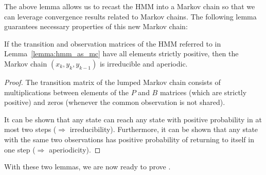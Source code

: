 \documentclass[journal]{IEEEtran}
\begin{document}
The above lemma allows us to recast the HMM into a Markov chain so that we can
leverage convergence results related to Markov chains. The following lemma
guarantees necessary properties of this new Markov chain:
\begin{lemma}
    If the transition and observation matrices of the HMM referred to in
    Lemma~\ref{lemma:hmm_as_mc} have all elements strictly positive, then the
    Markov chain $(x_k, y_k, y_{k-1})$ is irreducible and aperiodic.
    \label{lemma:ergodic_hmm_as_mc}
\end{lemma}
\begin{proof}
    The transition matrix of the lumped Markov chain consists of
    multiplications between elements of the $P$ and $B$ matrices (which are
    strictly positive) and zeros (whenever the common observation is not
    shared).
    
    It can be shown that any state can reach any state with positive
    probability in at most two steps ($\Rightarrow$ irreducibility).
    Furthermore, it can be shown that any state with the same two observations
    has positive probability of returning to itself in one step ($\Rightarrow$
    aperiodicity).
\end{proof}

With these two lemmas, we are now ready to prove .
\end{document}
